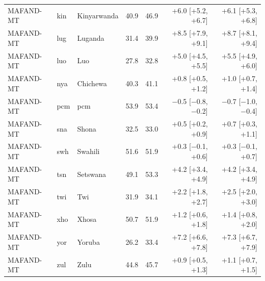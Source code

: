 {\begin{longtable}{@{}lllrrrr@{}}
MAFAND-MT & kin & Kinyarwanda & 40.9 & 46.9 & +6.0 [+5.2, +6.7] & +6.1 [+5.3, +6.8] \\
MAFAND-MT & lug & Luganda & 31.4 & 39.9 & +8.5 [+7.9, +9.1] & +8.7 [+8.1, +9.4] \\
MAFAND-MT & luo & Luo & 27.8 & 32.8 & +5.0 [+4.5, +5.5] & +5.5 [+4.9, +6.0] \\
MAFAND-MT & nya & Chichewa & 40.3 & 41.1 & +0.8 [+0.5, +1.2] & +1.0 [+0.7, +1.4] \\
MAFAND-MT & pcm & pcm & 53.9 & 53.4 & $-$0.5 [$-$0.8, $-$0.2] & $-$0.7 [$-$1.0, $-$0.4] \\
MAFAND-MT & sna & Shona & 32.5 & 33.0 & +0.5 [+0.2, +0.9] & +0.7 [+0.3, +1.1] \\
MAFAND-MT & swh & Swahili & 51.6 & 51.9 & +0.3 [$-$0.1, +0.6] & +0.3 [$-$0.1, +0.7] \\
MAFAND-MT & tsn & Setswana & 49.1 & 53.3 & +4.2 [+3.4, +4.9] & +4.2 [+3.4, +4.9] \\
MAFAND-MT & twi & Twi & 31.9 & 34.1 & +2.2 [+1.8, +2.7] & +2.5 [+2.0, +3.0] \\
MAFAND-MT & xho & Xhosa & 50.7 & 51.9 & +1.2 [+0.6, +1.8] & +1.4 [+0.8, +2.0] \\
MAFAND-MT & yor & Yoruba & 26.2 & 33.4 & +7.2 [+6.6, +7.8] & +7.3 [+6.7, +7.9] \\
MAFAND-MT & zul & Zulu & 44.8 & 45.7 & +0.9 [+0.5, +1.3] & +1.1 [+0.7, +1.5] \\
\end{longtable}}
